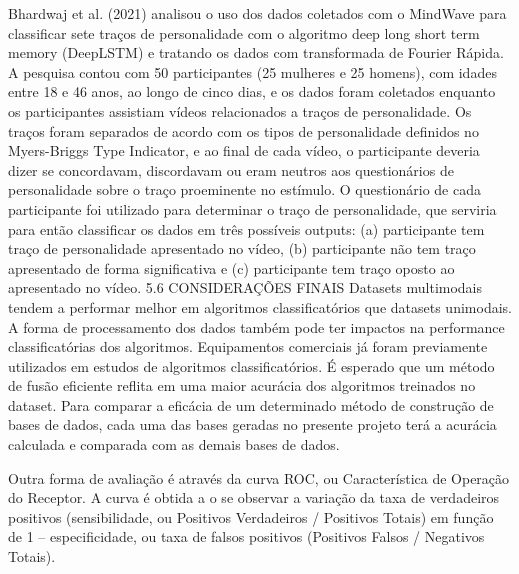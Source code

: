 Bhardwaj et al. (2021) analisou o uso dos dados coletados com o MindWave para classificar sete traços de personalidade com o algoritmo deep long short term memory (DeepLSTM) e tratando os dados com transformada de Fourier Rápida. A pesquisa contou com 50 participantes (25 mulheres e 25 homens), com idades entre 18 e 46 anos, ao longo de cinco dias, e os dados foram coletados enquanto os participantes assistiam vídeos relacionados a traços de personalidade. Os traços foram separados de acordo com os tipos de personalidade definidos no Myers-Briggs Type Indicator, e ao final de cada vídeo, o participante deveria dizer se concordavam, discordavam ou eram neutros aos questionários de personalidade sobre o traço proeminente no estímulo. O questionário de cada participante foi utilizado para determinar o traço de personalidade, que serviria para então classificar os dados em três possíveis outputs: (a) participante tem traço de personalidade apresentado no vídeo, (b) participante não tem traço apresentado de forma significativa e (c) participante tem traço oposto ao apresentado no vídeo. 
5.6 CONSIDERAÇÕES FINAIS
Datasets multimodais tendem a performar melhor em algoritmos classificatórios que datasets unimodais. 
A forma de processamento dos dados também pode ter impactos na performance classificatórias dos algoritmos. 
Equipamentos comerciais já foram previamente utilizados em estudos de algoritmos classificatórios. 
É esperado que um método de fusão eficiente reflita em uma maior acurácia dos algoritmos treinados no dataset. 
Para comparar a eficácia de um determinado método de construção de bases de dados, 
cada uma das bases geradas no presente projeto terá a acurácia calculada e comparada com as demais bases de dados.





Outra forma de avaliação é através da curva ROC, 
ou Característica de Operação do Receptor. A curva é obtida a
o se observar a variação da taxa de verdadeiros positivos (sensibilidade, ou Positivos Verdadeiros / Positivos Totais) em função de 1 – 
especificidade, ou taxa de falsos positivos (Positivos Falsos / Negativos Totais). 
